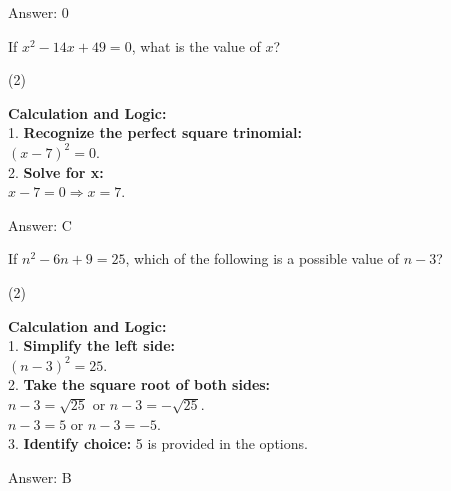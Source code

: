 \documentclass[11pt,paper=a4,answers]{exam}
\begin{document}
\begin{questions}
\begin{solution}
Answer: \colorbox{yellow!100}{0}
\end{solution}

\vspace{60pt}

\question
If $x^2 - 14x + 49 = 0$, what is the value of $x$?
\begin{tasks}(2)
\end{tasks}

\begin{solution}
\textbf{Calculation and Logic:} \\
1. \textbf{Recognize the perfect square trinomial:} \\
   $(x - 7)^2 = 0$. \\
2. \textbf{Solve for x:} \\
   $x - 7 = 0 \Rightarrow x = 7$.

\vspace{30pt}

Answer: \colorbox{yellow!100}{C}
\end{solution}

\vspace{60pt}

\question
If $n^2 - 6n + 9 = 25$, which of the following is a possible value of $n - 3$?
\begin{tasks}(2)
\end{tasks}

\begin{solution}
\textbf{Calculation and Logic:} \\
1. \textbf{Simplify the left side:} \\
   $(n - 3)^2 = 25$. \\
2. \textbf{Take the square root of both sides:} \\
   $n - 3 = \sqrt{25}$ or $n - 3 = -\sqrt{25}$. \\
   $n - 3 = 5$ or $n - 3 = -5$. \\
3. \textbf{Identify choice:} 5 is provided in the options.

\vspace{30pt}

Answer: \colorbox{yellow!100}{B}
\end{solution}

\vspace{60pt}


\end{questions}
\end{document}
